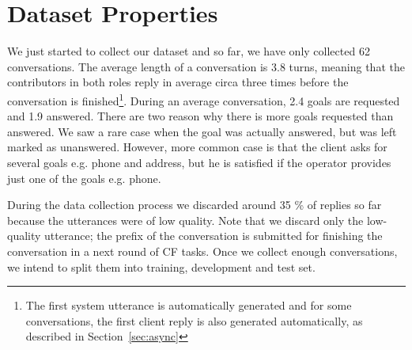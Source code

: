 \documentclass[runningheads,a4paper]{llncs}
\def\OP#1{#1}  %
\begin{document}
\section{Dataset Properties} \label{sec:props}
\vspace{-0.50em}
We just started to collect our dataset and so far, we have only collected \OP{62} conversations.
The average length of a conversation is \OP{3.8} turns, meaning that the contributors in both roles reply in average circa three times before the conversation is finished\footnote{The first system utterance is automatically generated and for some conversations, the first client reply is also generated automatically, as described in Section~\ref{sec:async}}.
During an average conversation, \OP{2.4} goals are requested and \OP{1.9} answered.
There are two reason why there is more goals requested than answered.
We saw a rare case when the goal was actually answered, but was left marked as unanswered.
However, more common case is that the client asks for several goals e.g. phone and address, but he is satisfied if the operator provides just one of the goals e.g. phone. 

During the data collection process we discarded around \OP{35} \% of replies so far because the utterances were of low quality.
Note that we discard only the low-quality utterance; the prefix of the conversation is submitted for finishing the conversation in a next round of CF tasks.
Once we collect enough conversations, we intend to split them into training, development and test set. %
\end{document}
